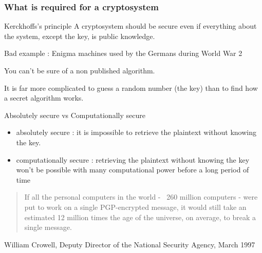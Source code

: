 \documentclass[compress]{beamer}
\theoremstyle{definition}
\theoremstyle{definition}
\theoremstyle{definition}
\theoremstyle{remark}
\theoremstyle{remark}
\theoremstyle{definition}
\theoremstyle{definition}
\theoremstyle{definition}
\theoremstyle{definition}
\theoremstyle{definition}
\theoremstyle{remark}
\theoremstyle{remark}
\theoremstyle{remark}
\theoremstyle{remark}
\begin{document}
				\subsubsection{What is required for a cryptosystem}
				\begin{frame}
					
					\begin{block}{Kerckhoffs's principle}
						A cryptosystem should be secure even if everything about the system, except the key, is public knowledge.
					\end{block}
					\vspace*{5mm}
					Bad example : Enigma machines used by the Germans during World War 2%
					
					\vspace*{5mm}
					You can't be sure of a non published algorithm.
					
					It is far more complicated to guess a random number (the key) than to find how a secret algorithm works.
				\end{frame}
				\begin{frame}	
					\begin{block}{Absolutely secure vs Computationally secure}
						\begin{itemize}
							\item absolutely secure : it is impossible to retrieve the plaintext without knowing the key.
								\vspace*{10mm}
							\item computationally secure : retrieving the plaintext without knowing the key won't be possible with many computational power before a long period of time %
						\end{itemize}
						
						
					\end{block}
					\vspace*{10mm}
					\begin{quote}If all the personal computers in the world - ~260 million computers - were put to work on a single PGP-encrypted message, it would still take an estimated 12 million times the age of the universe, on average, to break a single message.\end{quote}
					 William Crowell, Deputy Director of the National Security Agency, March 1997
				\end{frame}
				
\end{document}
